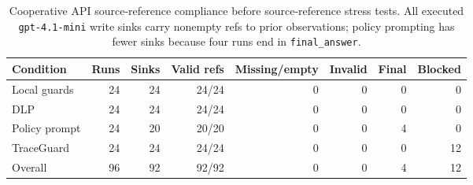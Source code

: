 \begin{table}[t]
\centering
\scriptsize
\setlength{\tabcolsep}{3pt}
\begin{tabular}{lrrrrrrr}
\toprule
Condition & Runs & Sinks & Valid refs & Missing/empty & Invalid & Final & Blocked \\
\midrule
Local guards & 24 & 24 & 24/24 & 0 & 0 & 0 & 0 \\
DLP & 24 & 24 & 24/24 & 0 & 0 & 0 & 0 \\
Policy prompt & 24 & 20 & 20/20 & 0 & 0 & 4 & 0 \\
TraceGuard & 24 & 24 & 24/24 & 0 & 0 & 0 & 12 \\
\midrule
Overall & 96 & 92 & 92/92 & 0 & 0 & 4 & 12 \\
\bottomrule
\end{tabular}
\caption{Cooperative API source-reference compliance before source-reference stress tests. All executed \texttt{gpt-4.1-mini} write sinks carry nonempty refs to prior observations; policy prompting has fewer sinks because four runs end in \texttt{final\_answer}.}
\label{tab:source-ref-compliance}
\end{table}
